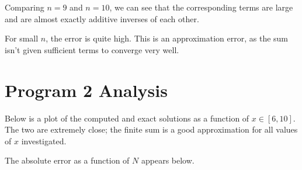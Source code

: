 \documentclass[11pt]{article}
\begin{document}
Comparing \(n=9\) and \(n=10\), we can see that the corresponding terms are large and are almost exactly additive inverses of each other.

For small \(n\), the error is quite high. This is an approximation error, as the sum isn't given sufficient terms to converge very well.

\section{Program 2 Analysis}
\label{sec:orgf7f6b3d}

Below is a plot of the computed and exact solutions as a function of \(x\in[6, 10]\). The two are extremely close; the finite sum is a good approximation for all values of \(x\) investigated.

The absolute error as a function of \(N\) appears below. 
\end{document}
